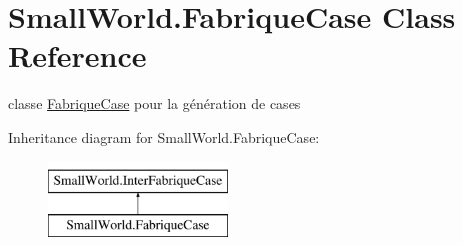 \hypertarget{class_small_world_1_1_fabrique_case}{\section{Small\-World.\-Fabrique\-Case Class Reference}
\label{class_small_world_1_1_fabrique_case}
}


classe \hyperlink{class_small_world_1_1_fabrique_case}{Fabrique\-Case} pour la génération de cases  


Inheritance diagram for Small\-World.\-Fabrique\-Case\-:\begin{figure}[H]
\begin{center}
\leavevmode
\includegraphics[height=2.000000cm]{class_small_world_1_1_fabrique_case}
\end{center}
\end{figure}
